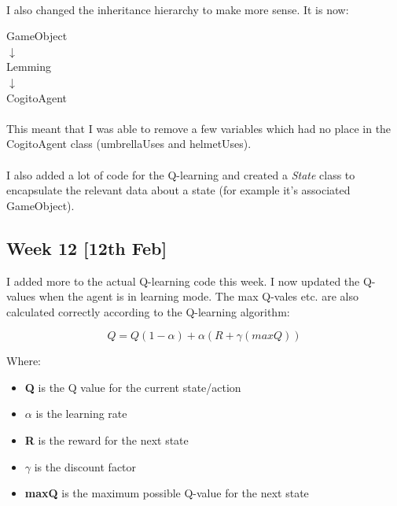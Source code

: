 \documentclass[a4paper,oneside]{report}
\begin{document}
\paragraph{} I also changed the inheritance hierarchy to make more sense. It is now:

\begin{center} GameObject \\ $\downarrow$ \\ Lemming \\ $\downarrow$ \\ CogitoAgent \end{center}

\paragraph{}This meant that I was able to remove a few variables which had no place in the CogitoAgent class (umbrellaUses and helmetUses).

\paragraph{} I also added a lot of code for the Q-learning and created a \emph{State} class to encapsulate the relevant data about a state (for example it's associated GameObject).



\subsection{Week 12 [12th Feb]}

I added more to the actual Q-learning code this week. I now updated the Q-values when the agent is in learning mode. The max Q-vales etc. are also calculated correctly according to the Q-learning algorithm:

\begin{equation*}
	Q = Q(1 - \alpha) + \alpha(R + \gamma(maxQ))
\end{equation*}

Where:
\begin{itemize}
	\item \textbf{Q} is the Q value for the current state/action
	\item \textbf{$\alpha$} is the learning rate
	\item \textbf{R} is the reward for the next state
	\item \textbf{$\gamma$} is the discount factor
	\item \textbf{maxQ} is the maximum possible Q-value for the next state
\end{itemize}
\end{document}
